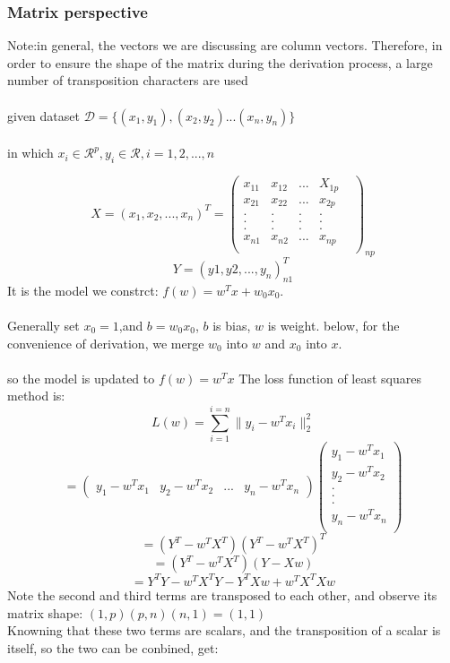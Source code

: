 \documentclass{report}
\begin{document}
\subsubsection{Matrix perspective}
Note:in general, the vectors we are discussing are column vectors. Therefore, in order to ensure the shape of the matrix during the derivation process, a large number of transposition characters are used\\\\
given dataset $\mathcal{D}=\{(x_1,y_1),(x_2,y_2)...(x_n, y_n)\}$\\\\
in which $x_i\in \mathcal{R}^p, y_i\in \mathcal{R}, i=1,2,...,n$

$$
X=(x_1,x_2,...,x_n)^T=\begin{pmatrix}
x_{11}&x_{12}&...&X_{1p}\\
x_{21}&x_{22}&...&x_{2p}\\
.&.&.&.&\\
.&.&.&.&\\
.&.&.&.&\\
x_{n1}&x_{n2}&...&x_{np}\\
\end{pmatrix}_{np}
$$
$$
Y=(y1,y2,...,y_n)_{n1}^T
$$
It is the model we constrct: $f(w)=w^Tx+w_0 x_0.$\\\\
Generally set $x_0=1$,and $b=w_0 x_0$, $b$ is bias, $w$ is weight. below, for the convenience of derivation, we merge $w_0$ into $w$ and $x_0$ into $x$.\\\\
so the model is updated to $f(w)=w^Tx$
The loss function of least squares method is:
$$
L(w)=\sum_{i=1}^{i=n}\|y_i-w^T x_i\|_2^2
$$
$$
=\begin{pmatrix}
y_1-w^Tx_1&y_2-w^Tx_2&...&y_n-w^Tx_n
\end{pmatrix}
\begin{pmatrix}
y_1-w^Tx_1\\
y_2-w^Tx_2\\
.\\
.\\
.\\
y_n-w^Tx_n\\
\end{pmatrix}
$$
$$
=(Y^T-w^TX^T)(Y^T-w^TX^T)^T
$$
$$
=(Y^T-w^TX^T)(Y-Xw)
$$
$$
=Y^TY-w^TX^TY-Y^TXw+w^TX^TXw
$$
Note the second and third terms are transposed to each other, and observe its matrix shape: $(1,p)(p,n)(n,1)=(1,1)$\\
Knowning that these two terms are scalars, and the transposition of a scalar is itself, so the two can be conbined, get:
\end{document}
